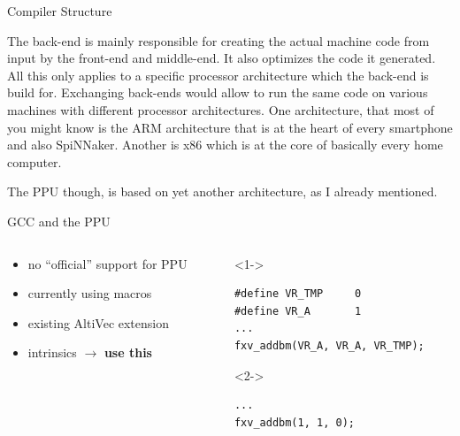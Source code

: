 \documentclass[10pt,aspectratio=169]{beamer}
\begin{document}
\begin{frame}[fragile]{Compiler Structure}
{		The back-end is mainly responsible for creating the actual machine code from input by the front-end and middle-end.
		It also optimizes the code it generated.
		All this only applies to a specific processor architecture which the back-end is build for.
		Exchanging back-ends would allow to run the same code on various machines with different processor architectures.
		One architecture, that most of you might know is the ARM architecture that is at the heart of every smartphone and also SpiNNaker.
		Another is x86 which is at the core of basically every home computer.

		The PPU though, is based on yet another architecture, as I already mentioned.}
\end{frame}

\begin{frame}[fragile]{GCC and the PPU}
    \begin{columns}[c]
    \begin{column}{0.5\textwidth}
        \begin{itemize}
			\setlength\itemsep{1em}
            \item no ``official'' support for PPU
			\item currently using macros
			\item<3-> existing AltiVec extension
			\item<4-> intrinsics $\rightarrow$ \textbf{use this}
        \end{itemize}
    \end{column}

    \begin{column}{0.5\textwidth}
        \centering
		\begin{visibleenv}<1->
				\begin{lstlisting}[title=Example for macro usage]
#define VR_TMP     0
#define VR_A       1
...
fxv_addbm(VR_A, VR_A, VR_TMP);
				\end{lstlisting}
	\end{visibleenv}

		\begin{visibleenv}<2->
				\begin{lstlisting}[title=Preprocessed example]
...
fxv_addbm(1, 1, 0);
				\end{lstlisting}
	\end{visibleenv}


\end{column}
\end{columns}
\end{frame}
\end{document}
